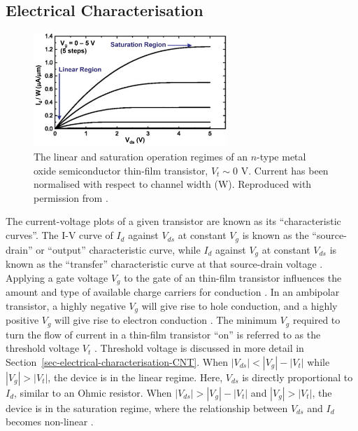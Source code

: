 \documentclass[
  a4paper,
]{scrbook}
\begin{document}
\hypertarget{electrical-characterisation}{%
\subsection{Electrical
Characterisation}\label{electrical-characterisation}}

\begin{figure}

{\centering \includegraphics[width=0.65\textwidth,height=\textheight]{figures/ch2/linear_region_edit.png}

}

\caption[The linear and saturation operation regimes of an \(n\)-type
metal oxide semiconductor thin-film
transistor.]{\label{fig-linear-region}The linear and saturation
operation regimes of an \(n\)-type metal oxide semiconductor thin-film
transistor, \(V_{t} \sim 0\) V. Current has been normalised with respect
to channel width (W). Reproduced with permission from
\autocite{Petti2016}.}

\end{figure}

The current-voltage plots of a given transistor are known as its
``characteristic curves''. The I-V curve of \(I_d\) against \(V_{ds}\)
at constant \(V_g\) is known as the ``source-drain'' or ``output''
characteristic curve, while \(I_d\) against \(V_g\) at constant
\(V_{ds}\) is known as the ``transfer'' characteristic curve at that
source-drain voltage \autocite{Kauffman2008,Petti2016,Shkodra2021}.
Applying a gate voltage \(V_g\) to the gate of an thin-film transistor
influences the amount and type of available charge carriers for
conduction \autocite{Avouris2007,Tran2016,Heller2009a}. In an ambipolar
transistor, a highly negative \(V_g\) will give rise to hole conduction,
and a highly positive \(V_g\) will give rise to electron conduction
\autocite{Avouris2007,Yao2021,Li2023}. The minimum \(V_g\) required to
turn the flow of current in a thin-film transistor ``on'' is referred to
as the threshold voltage \(V_t\)
\autocite{Petti2016,Shkodra2021,Li2023}. Threshold voltage is discussed
in more detail in Section~\ref{sec-electrical-characterisation-CNT}.
When \(|V_{ds}| < |V_g| - |V_t|\) while \(|V_g|>|V_t|\), the device is
in the linear regime. Here, \(V_{ds}\) is directly proportional to
\(I_{d}\), similar to an Ohmic resistor. When
\(|V_{ds}| > |V_g| - |V_t|\) and \(|V_g|>|V_t|\), the device is in the
saturation regime, where the relationship between \(V_{ds}\) and
\(I_{d}\) becomes non-linear \autocite{Petti2016,Shkodra2021,Li2023}.
\end{document}
